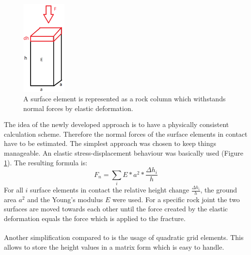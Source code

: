 \begin{figure}[htb!]
\begin{center}
\includegraphics[width=0.2\textwidth]{./figures/FFS_NormalForce.png}
\end{center}
\caption{A surface element is represented as a rock column which with\-stands normal forces by elastic deformation.}
\label{Fig:FFS-NormalForce}
\end{figure}
The idea of the newly developed approach is to have a physically consistent calculation scheme. Therefore the normal forces of the surface elements in contact have to be estimated. The simplest approach was chosen to keep things manageable. An elastic stress-displacement behaviour was basically used (Figure \ref{Fig:FFS-NormalForce}). The resulting formula is:
\begin{equation}
F_n= \sum_i E * a^2 * \frac{\Delta h_i}{h}
\end{equation}
For all $i$ surface elements in contact the relative height change $\frac{\Delta h_i}{h}$, the ground area $a^2$ and the Young's modulus $E$ were used. For a specific rock joint the two surfaces are moved towards each other until the force created by the elastic deformation equals the force which is applied to the fracture.\\
\ \\
Another simplification compared to \cite{Casagrande2017} is the usage of quadratic grid elements. This allows to store the height values in a matrix form which is easy to handle.  